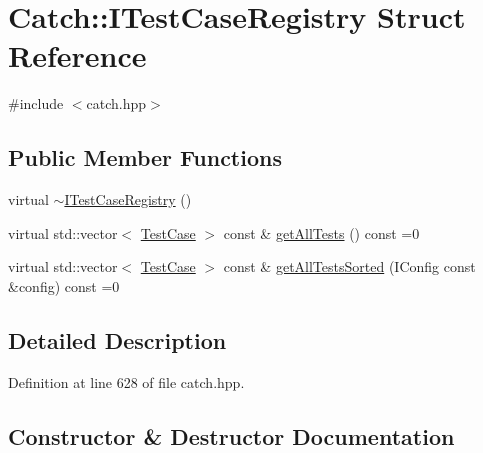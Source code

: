 \hypertarget{struct_catch_1_1_i_test_case_registry}{}\section{Catch\+:\+:I\+Test\+Case\+Registry Struct Reference}
\label{struct_catch_1_1_i_test_case_registry}


{\ttfamily \#include $<$catch.\+hpp$>$}

\subsection*{Public Member Functions}
\begin{DoxyCompactItemize}
\item 
virtual \hyperlink{struct_catch_1_1_i_test_case_registry_ae14798f05ac8e2b18cff532849a4da81}{$\sim$\+I\+Test\+Case\+Registry} ()
\item 
virtual std\+::vector$<$ \hyperlink{class_catch_1_1_test_case}{Test\+Case} $>$ const  \& \hyperlink{struct_catch_1_1_i_test_case_registry_ad6e4d4a621655123f73ae98cfeda063d}{get\+All\+Tests} () const =0
\item 
virtual std\+::vector$<$ \hyperlink{class_catch_1_1_test_case}{Test\+Case} $>$ const  \& \hyperlink{struct_catch_1_1_i_test_case_registry_a33e46639d0319d35497c05bb5d02be5a}{get\+All\+Tests\+Sorted} (I\+Config const \&config) const =0
\end{DoxyCompactItemize}


\subsection{Detailed Description}


Definition at line 628 of file catch.\+hpp.



\subsection{Constructor \& Destructor Documentation}
\hypertarget{struct_catch_1_1_i_test_case_registry_ae14798f05ac8e2b18cff532849a4da81}{}\label{struct_catch_1_1_i_test_case_registry_ae14798f05ac8e2b18cff532849a4da81} 
